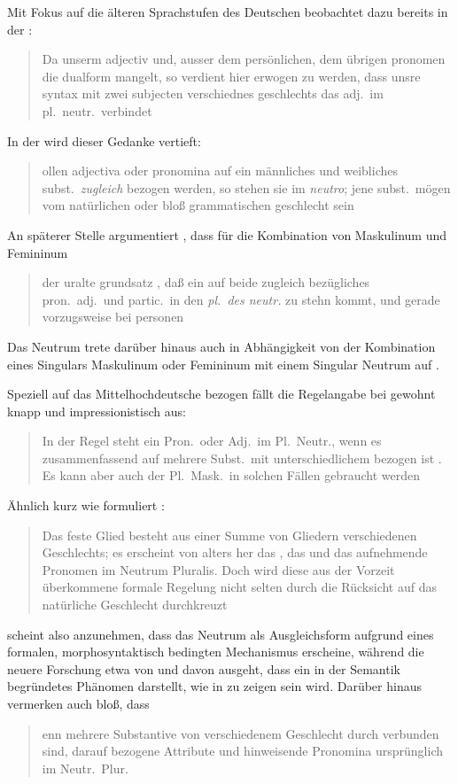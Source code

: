 Mit Fokus auf die älteren Sprachstufen des Deutschen beobachtet dazu bereits
\citeauthor{grimm1848} in der :
\blockcquote[978]{grimm1848}{Da unserm adjectiv und, ausser dem
persönlichen, dem übrigen pronomen die dualform mangelt, so verdient
hier erwogen zu werden, dass unsre syntax mit zwei subjecten verschiednes
geschlechts das adj.\ im pl.~neutr.\ verbindet}. In der  wird dieser Gedanke vertieft:
\blockcquote[311--312]{grimm1890}{ollen adjectiva oder pronomina
auf ein männliches und weibliches subst.\ \emph{zugleich} bezogen werden, so
stehen sie im \emph{neutro}; jene subst.\ mögen vom natürlichen oder bloß
grammatischen geschlecht sein}. An späterer Stelle argumentiert
\citeauthor{grimm1898}, dass für die Kombination von Maskulinum und Femininum
\blockcquote[329]{grimm1898}{der uralte grundsatz , daß ein auf
beide zugleich bezügliches pron.\ adj.\ und partic.\ in den \emph{pl.\ des
\mbox{neutr.}} zu stehn kommt, und gerade vorzugsweise bei personen}. Das
Neutrum trete darüber hinaus auch in Abhängigkeit von der Kombination eines
Singulars Maskulinum oder Femininum mit einem Singular Neutrum auf
\autocite[331]{grimm1898}.

Speziell auf das Mittelhochdeutsche bezogen fällt die
Regelangabe bei \citeauthor{paul2007} gewohnt knapp und impressionistisch aus:
\blockcquote[384]{paul2007}{In der Regel steht ein Pron.\ oder Adj.\ im
Pl.~Neutr., wenn es zusammenfassend auf mehrere Subst.\ mit unterschiedlichem
 bezogen ist \textelp{}. Es kann aber auch der Pl.~Mask.\ in solchen
Fällen gebraucht werden}. Ähnlich kurz wie \citet{paul2007} formuliert
\citet[39]{behaghel1928}: \blockquote{Das feste Glied besteht aus einer Summe
von Gliedern verschiedenen Geschlechts; es erscheint von alters her das
, das  und das aufnehmende Pronomen im Neutrum
Pluralis. \textelp{} Doch wird diese aus der Vorzeit überkommene formale
Regelung nicht selten durch die Rücksicht auf das natürliche Geschlecht
durchkreuzt}.

\citet{behaghel1928} scheint also anzunehmen, dass das Neutrum als
Ausgleichsform aufgrund eines formalen, morphosyntaktisch bedingten Mechanismus
erscheine, während die neuere Forschung etwa von \citet{wechslerzlatic2003} und
\citet{wechsler2009} davon ausgeht, dass  ein in der
Semantik begründetes Phänomen darstellt, wie in  zu
zeigen sein wird. Darüber hinaus vermerken auch \citet[188]{dal2014} bloß, dass
\blockquote{enn mehrere Substantive von verschiedenem Geschlecht
durch  verbunden sind, \textelp{} darauf bezogene
Attribute und hinweisende Pronomina ursprünglich im Neutr.\ Plur.\
}.

